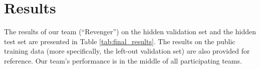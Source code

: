 \section{Results}
\label{sec:results}




The results of our team (``Revenger'') on the hidden validation set and the hidden test set are presented in Table \ref{tab:final_results}. The results on the public training data (more specifically, the left-out validation set) are also provided for reference. Our team's performance is in the middle of all participating teams.
